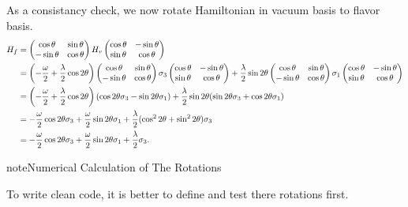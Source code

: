 \documentclass[letterpaper,12pt,english]{sphinxmanual}
\begin{document}
As a consistancy check, we now rotate Hamiltonian in vacuum basis to flavor basis.
\begin{gather}
\begin{split}H_f &= \begin{pmatrix} \cos \theta & \sin \theta \\ -\sin \theta & \cos\theta \end{pmatrix} H_v \begin{pmatrix} \cos \theta & -\sin \theta \\ \sin \theta & \cos\theta \end{pmatrix}\\
&= \left(-\frac{\omega}{2} + \frac{\lambda}{2} \cos 2\theta \right) \begin{pmatrix} \cos \theta & \sin \theta \\ -\sin \theta & \cos\theta \end{pmatrix} \sigma_3 \begin{pmatrix} \cos \theta & -\sin \theta \\ \sin \theta & \cos\theta \end{pmatrix} + \frac{\lambda}{2} \sin 2\theta \begin{pmatrix} \cos \theta & \sin \theta \\ -\sin \theta & \cos\theta \end{pmatrix} \sigma_1 \begin{pmatrix} \cos \theta & -\sin \theta \\ \sin \theta & \cos\theta \end{pmatrix} \\
& = \left(-\frac{\omega}{2} + \frac{\lambda}{2} \cos 2\theta \right) ( \cos 2\theta \sigma_3 - \sin 2\theta \sigma_1 ) + \frac{\lambda}{2}\sin 2\theta ( \sin 2\theta \sigma_3 + \cos 2\theta \sigma_1 ) \\
& = -\frac{\omega}{2} \cos 2\theta \sigma_3 + \frac{\omega}{2}\sin 2\theta \sigma_1 + \frac{\lambda}{2} ( \cos^2 2\theta + \sin ^2 2\theta ) \sigma_3 \\
& = -\frac{\omega}{2} \cos 2\theta \sigma_3 + \frac{\omega}{2}\sin 2\theta \sigma_1 + \frac{\lambda}{2}\sigma_3 .\end{split}\notag
\end{gather}
\begin{notice}{note}{Numerical Calculation of The Rotations}

To write clean code, it is better to define and test there rotations first.
\end{notice}
\end{document}
